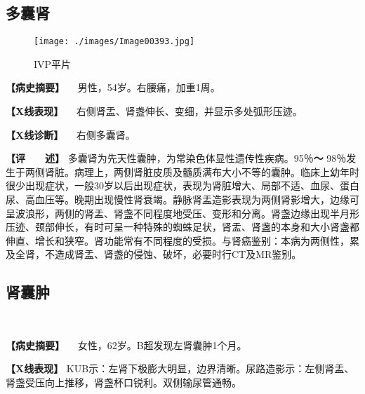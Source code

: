 \subsection{多囊肾}

\begin{figure}[!htbp]
    \centering
    \texttt{[image: ./images/Image00393.jpg]}
    \captionsetup{justification=centering}
    \caption{IVP平片}
    \label{fig6-6-1}
\end{figure}

\textbf{【病史摘要】} 　男性，54岁。右腰痛，加重1周。

\textbf{【X线表现】} 　右侧肾盂、肾盏伸长、变细，并显示多处弧形压迹。

\textbf{【X线诊断】} 　右侧多囊肾。

\textbf{【评　　述】}
多囊肾为先天性囊肿，为常染色体显性遗传性疾病。95％\textbf{～}
98％发生于两侧肾脏。病理上，两侧肾脏皮质及髓质满布大小不等的囊肿。临床上幼年时很少出现症状，一般30岁以后出现症状，表现为肾脏增大、局部不适、血尿、蛋白尿、高血压等。晚期出现慢性肾衰竭。静脉肾盂造影表现为两侧肾影增大，边缘可呈波浪形，两侧的肾盂、肾盏不同程度地受压、变形和分离。肾盏边缘出现半月形压迹、颈部伸长，有时可呈一种特殊的蜘蛛足状，肾盂、肾盏的本身和大小肾盏都伸直、增长和狭窄。肾功能常有不同程度的受损。与肾癌鉴别：本病为两侧性，累及全肾，不造成肾盂、肾盏的侵蚀、破坏，必要时行CT及MR鉴别。

\subsection{肾囊肿}

\begin{figure}
    \centering
    \\
    \caption{}
    \label{fig6-6-2}
\end{figure}

\textbf{【病史摘要】} 　女性，62岁。B超发现左肾囊肿1个月。

\textbf{【X线表现】}
KUB示：左肾下极膨大明显，边界清晰。尿路造影示：左侧肾盂、肾盏受压向上推移，肾盏杯口锐利。双侧输尿管通畅。

